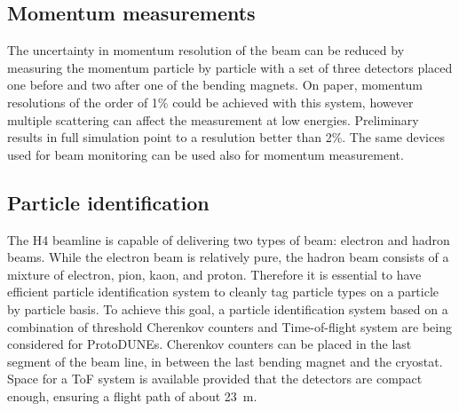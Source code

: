 \subsection{Momentum measurements}
The uncertainty in momentum resolution of the beam can be reduced by measuring the momentum particle by particle with a set of three detectors placed one before and two after one of the bending magnets. On paper, momentum resolutions of the order of 1\% could be achieved with this system, however  multiple scattering can affect the measurement at low energies. Preliminary results in full simulation point to a resulution better than 2\%. 
The same devices used for beam monitoring can be used also for momentum measurement.

\subsection{Particle identification}
The H4 beamline is capable of delivering two types of beam: electron and hadron beams. While the electron beam is relatively pure, the hadron beam consists of a mixture of electron, pion, kaon, and proton. Therefore it is essential to have efficient particle identification system to cleanly tag particle types on a particle by particle basis. To achieve this goal, a particle identification system based on a combination of threshold Cherenkov counters and Time-of-flight system are being considered for ProtoDUNEs. Cherenkov counters can be placed in the last segment of the beam line, in between the last bending magnet and the cryostat. Space for a ToF system is available provided that the detectors are compact enough, ensuring a flight path of about 23~m.

